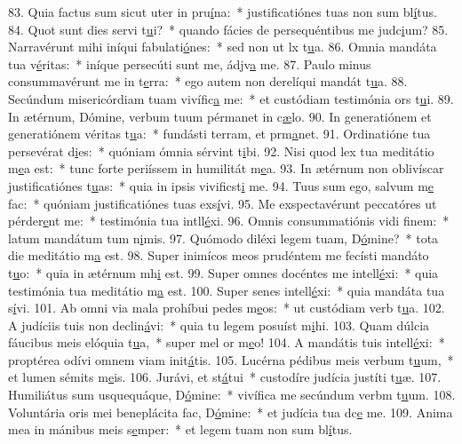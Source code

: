 83. Quia factus sum sicut uter in pru\uline{í}na:~* justificatiónes tuas non sum bl\uline{í}tus.
84. Quot sunt dies servi t\uline{u}i?~* quando fácies de persequéntibus me judc\uline{i}um?
85. Narravérunt mihi iníqui fabulati\uline{ó}nes:~* sed non ut lx t\uline{u}a.
86. Omnia mandáta tua v\uline{é}ritas:~* iníque persecúti sunt me, ádjv\uline{a} me.
87. Paulo minus consummavérunt me in t\uline{e}rra:~* ego autem non derelíqui mandát t\uline{u}a.
88. Secúndum misericórdiam tuam vivífic\uline{a} me:~* et custódiam testimónia ors t\uline{u}i.
89. In ætérnum, Dómine, verbum tuum pérmanet in c\uline{æ}lo.
90. In generatiónem et generatiónem véritas t\uline{u}a:~* fundásti terram, et prm\uline{a}net.
91. Ordinatióne tua persevérat d\uline{i}es:~* quóniam ómnia sérvint t\uline{i}bi.
92. Nisi quod lex tua meditátio m\uline{e}a est:~* tunc forte periíssem in humilitát m\uline{e}a.
93. In ætérnum non oblivíscar justificatiónes t\uline{u}as:~* quia in ipsis vivificst\uline{i} me.
94. Tuus sum ego, salvum m\uline{e} fac:~* quóniam justificatiónes tuas exs\uline{í}vi.
95. Me exspectavérunt peccatóres ut pérder\uline{e}nt me:~* testimónia tua intll\uline{é}xi.
96. Omnis consummatiónis vidi f\uline{i}nem:~* latum mandátum tum n\uline{i}mis.
97. Quómodo diléxi legem tuam, D\uline{ó}mine?~* tota die meditátio m\uline{a} est.
98. Super inimícos meos prudéntem me fecísti mandáto t\uline{u}o:~* quia in ætérnum mh\uline{i} est.
99. Super omnes docéntes me intell\uline{é}xi:~* quia testimónia tua meditátio m\uline{a} est.
100. Super senes intell\uline{é}xi:~* quia mandáta tua s\uline{í}vi.
101. Ab omni via mala prohíbui pedes m\uline{e}os:~* ut custódiam verb t\uline{u}a.
102. A judíciis tuis non declin\uline{á}vi:~* quia tu legem posuíst m\uline{i}hi.
103. Quam dúlcia fáucibus meis elóquia t\uline{u}a,~* super mel or m\uline{e}o!
104. A mandátis tuis intell\uline{é}xi:~* proptérea odívi omnem viam init\uline{á}tis.
105. Lucérna pédibus meis verbum t\uline{u}um,~* et lumen sémits m\uline{e}is.
106. Jurávi, et st\uline{á}tui~* custodíre judícia justíti t\uline{u}æ.
107. Humiliátus sum usquequáque, D\uline{ó}mine:~* vivífica me secúndum verbm t\uline{u}um.
108. Voluntária oris mei beneplácita fac, D\uline{ó}mine:~* et judícia tua dc\uline{e} me.
109. Anima mea in mánibus meis s\uline{e}mper:~* et legem tuam non sum bl\uline{í}tus.
